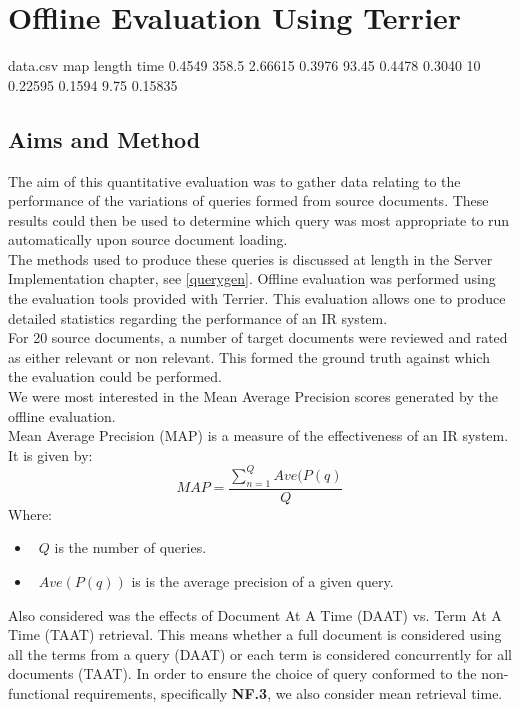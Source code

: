 \documentclass{l4proj}
\begin{document}
\section{Offline Evaluation Using Terrier}
\begin{filecontents*}{data.csv}
map length time
0.4549  358.5  2.66615
0.3976  93.45  0.4478
0.3040  10  0.22595
0.1594  9.75  0.15835
\end{filecontents*}
\subsection{Aims and Method}
The aim of this quantitative evaluation was to gather data relating to the performance of the variations of queries formed from source documents. These results could then be used to determine which query was most appropriate to run automatically upon source document loading. \\
The methods used to produce these queries is discussed at length in the Server Implementation chapter, see \ref{querygen}.
Offline evaluation was performed using the evaluation tools provided with Terrier. This evaluation allows one to produce detailed statistics regarding the performance of an IR system.\\
For 20 source documents, a number of target documents were reviewed and rated as either relevant or non relevant. This formed the ground truth against which the evaluation could be performed.\\
We were most interested in the Mean Average Precision scores generated by the offline evaluation.\\
Mean Average Precision (MAP) is a measure of the effectiveness of an IR system.
It is given by:
\begin{displaymath}
  MAP=\frac{\sum_{n=1}^{Q} Ave(P(q)}{Q}
\end{displaymath}
Where: 
\begin{itemize}
\item{~$Q$ is the number of queries.}
\item{~$Ave(P(q))$ is is the average precision of a given query.}
\end{itemize}

Also considered was the effects of Document At A Time (DAAT) vs. Term At A Time (TAAT) retrieval. This means whether a full document is considered using all the terms from a query (DAAT) or each term is considered concurrently for all documents (TAAT). In order to ensure the choice of query conformed to the non-functional requirements, specifically \textbf{NF.3}, we also consider mean retrieval time.
\end{document}
